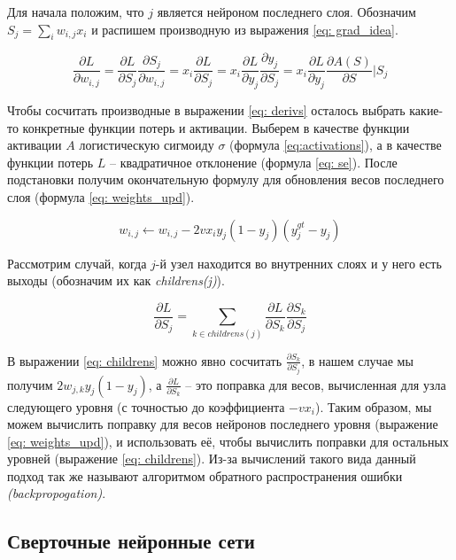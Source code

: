 Для начала положим, что $j$ является 
нейроном последнего слоя. Обозначим $S_{j} = \sum_{i} w_{i, j} x_{i}$ и
распишем производную из выражения \ref{eq: grad_idea}.

\begin{equation}\label{eq: derivs}
    \frac{\partial L}{\partial w_{i, j}} = 
    \frac{\partial L}{\partial S_j} \frac{\partial S_j}{\partial w_{i, j}} =
    x_i \frac{\partial L}{\partial S_j} =
    x_i \frac{\partial L}{\partial y_j} \frac{\partial y_j}{\partial S_j} =
    x_i \frac{\partial L}{\partial y_j}  \frac{\partial A(S)}{\partial S} | S_j
\end{equation}

Чтобы сосчитать производные в выражении \ref{eq: derivs} осталось выбрать какие-то конкретные
функции потерь и активации. Выберем в качестве функции активации $A$ 
логистическую сигмоиду $\sigma$ (формула \ref{eq:activations}), а в качестве функции потерь
$L$ -- квадратичное отклонение (формула \ref{eq: se}). После подстановки получим
окончательную формулу для обновления весов последнего слоя (формула \ref{eq: weights_upd}).

\begin{equation}\label{eq: weights_upd}
    w_{i, j} \leftarrow w_{i, j} - 2 v x_i y_j (1 - y_j) (y^{gt}_j - y_j)
\end{equation}

Рассмотрим случай, когда $j$-й узел находится во внутренних слоях и 
у него есть выходы (обозначим их как \textit{childrens(j)}).

\begin{equation}\label{eq: childrens}
    \frac{\partial L}{\partial S_j} = 
    \sum_{k \in childrens(j)} \frac{\partial L}{\partial S_k} \frac{\partial S_k}{\partial S_j} 
\end{equation}


\indent
\indent
В выражении \ref{eq: childrens} можно явно сосчитать 
$\frac{\partial S_k}{\partial S_j}$, в нашем случае мы получим 
$2 w_{j, k} y_j (1 - y_j)$, а $\frac{\partial L}{\partial S_k}$ -- это поправка для весов, вычисленная для узла 
следующего уровня (с точностью до коэффициента $-v x_i$). Таким образом, мы можем вычислить
поправку для весов нейронов последнего уровня (выражение \ref{eq: weights_upd}), и использовать
её, чтобы вычислить поправки для остальных уровней
(выражение \ref{eq: childrens}). Из-за вычислений такого вида
 данный подход так же называют алгоритмом обратного распространения ошибки \textit{(backpropogation)}.
 

\subsection{Сверточные нейронные сети}

